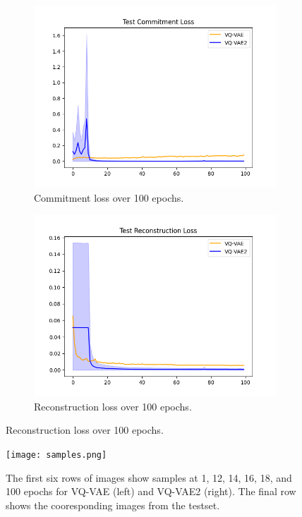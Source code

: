 \documentclass{article}
\begin{document}
\begin{figure}[t]
    \centering
    \begin{subfigure}{.49\linewidth}
        \centering
        \includegraphics[width=\linewidth]{commit.png}
        \caption{Commitment loss over 100 epochs.}
    \end{subfigure}
    \begin{subfigure}{.49\linewidth}
        \centering
        \includegraphics[width=\linewidth]{recon.png}
        \caption{Reconstruction loss over 100 epochs.}
    \end{subfigure}
    \label{fig:loss}
\end{figure}

\begin{figure}[t]
    \centering
    \texttt{[image: samples.png]}
    \label{fig:samples}
    \caption{The first six rows of images show samples at 1, 12, 14, 16, 18, and 100 epochs for VQ-VAE (left) and VQ-VAE2 (right). The final row shows the cooresponding images from the testset.}
\end{figure}
\end{document}
